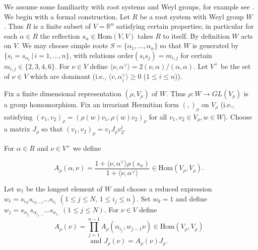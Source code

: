 \documentclass{acm_proc_article-sp}
\newcommand{\R}{{\mathbb R}}
\renewcommand{\H}{{\mathcal H}}
\newcommand{\ch}[1]{#1^\vee}
\newcommand\brach[2]{\langle#1,\ch#2\rangle}
\newcommand{\Hom}{\text{Hom}}
\begin{document}
%
%

We assume some familiarity with root systems and Weyl groups, for example see 
\cite{humphreys_coxeter}.
We begin with a formal construction.  Let $R$ be a root system with
Weyl group $W$. Thus $R$ is a finite subset of $V=\R^n$ satisfying
certain properties; in particular for each $\alpha\in R$
the reflection $s_\alpha\in \Hom(V,V)$ takes $R$ to itself.  By
definition $W$ acts on $V$. We may choose simple roots
$S=\{\alpha_1,\dots, \alpha_n\}$ so that $W$ is generated by
$\{s_i=s_{\alpha_i}\,|\,i=1,\dots,n\}$, with relations
$\text{order}(s_is_j)=m_{i,j}$ for certain $m_{i,j}\in\{2,3,4,6\}$.
For $\nu\in V$ define $\brach \nu\alpha=2(\nu,\alpha)/(\alpha,\alpha)$. 
Let $V^+$ be the set of $\nu\in V$ which are dominant (i.e.,
$\brach v{\alpha_i}\ge0$ ($1\le i\le n$)).

Fix a finite dimensional representation $(\rho,V_\rho)$ of $W$.
Thus $\rho:W\rightarrow GL(V_\rho)$ is a group
homomorphism. Fix an invariant Hermitian form $(,)_\rho$ on
$V_\rho$ (i.e., satisfying
$(v_1,v_2)_\rho=(\rho(w)v_1,\rho(w)v_2)_\rho$ 
for all $v_1,v_2\in
V_\rho, w\in W$). 
Choose a matrix $J_\rho$ so that $(v_1,v_2)_\rho=v_1J_\rho v_2^t$.


For $\alpha\in R$ and  $\nu\in V^+$ we define 

\begin{equation}
\label{A}
A_\rho(\alpha,\nu)=\frac{1+\brach\nu{\alpha}\rho(s_{\alpha})}{1+\brach\nu{\alpha}}
\in\Hom(V_\rho,V_\rho).
\end{equation}

Let $w_\ell$ be the longest element of $W$ and choose a reduced expression
$w_\ell=s_{i_N}s_{i_{N-1}}\dots s_{i_1}$
$(1\le j\le N,\,1\le i_j\le n)$.
Set $w_0=1$  and define
$w_j=s_{\alpha_{i_j}}s_{\alpha_{i_{j-1}}}\dots s_{\alpha_{i_1}}$
$(1\le j\le N)$.
For $\nu\in V$ define
\begin{equation}
A_\rho(\nu)=\prod_{j=1}^{n-1}A_\rho(\alpha_{i_j},w_{j-1}\nu)\in\Hom(V_\rho,V_\rho)
\end{equation}
\begin{equation}
\mbox{and }
J_\rho(\nu)=A_\rho(\nu)J_\rho.
\end{equation}
\end{document}
